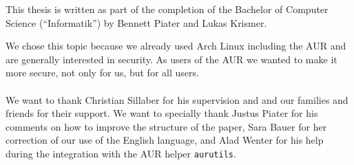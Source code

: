 This thesis is written as part of the completion of the Bachelor of Computer Science (``Informatik'') by Bennett Piater and Lukas Krismer.

We chose this topic because we already used Arch Linux including the AUR and are generally interested in security. As users of the AUR we wanted to make it more secure, not only for us, but for all users.

\paragraph*{}

We want to thank Christian Sillaber for his supervision and
and our families and friends for their support.
We want to specially thank Justus Piater for his comments on how to improve the structure of the paper, Sara Bauer for her correction of our use of the English language, and Alad Wenter for his help during the integration with the AUR helper \texttt{aurutils}.
